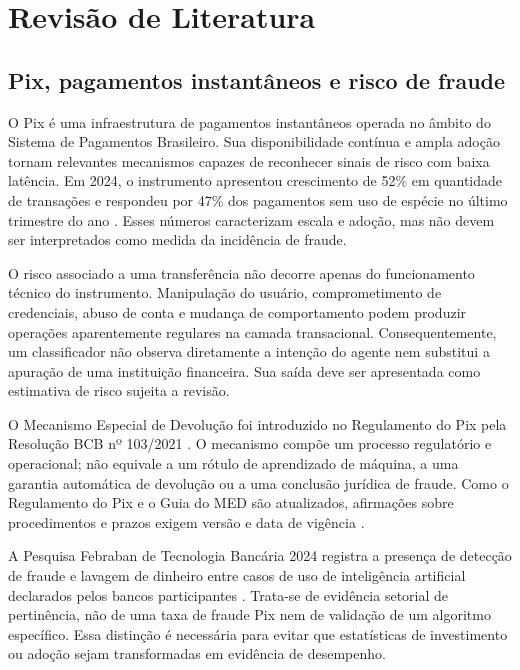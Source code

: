 \chapter{Revisão de Literatura}

\section{Pix, pagamentos instantâneos e risco de fraude}

O Pix é uma infraestrutura de pagamentos instantâneos operada no âmbito do Sistema de Pagamentos Brasileiro. Sua disponibilidade contínua e ampla adoção tornam relevantes mecanismos capazes de reconhecer sinais de risco com baixa latência. Em 2024, o instrumento apresentou crescimento de 52\% em quantidade de transações e respondeu por 47\% dos pagamentos sem uso de espécie no último trimestre do ano \cite{bcb_pagamentos_2024}. Esses números caracterizam escala e adoção, mas não devem ser interpretados como medida da incidência de fraude.

O risco associado a uma transferência não decorre apenas do funcionamento técnico do instrumento. Manipulação do usuário, comprometimento de credenciais, abuso de conta e mudança de comportamento podem produzir operações aparentemente regulares na camada transacional. Consequentemente, um classificador não observa diretamente a intenção do agente nem substitui a apuração de uma instituição financeira. Sua saída deve ser apresentada como estimativa de risco sujeita a revisão.

O Mecanismo Especial de Devolução foi introduzido no Regulamento do Pix pela Resolução BCB nº 103/2021 \cite{bcb_resolucao103_2021}. O mecanismo compõe um processo regulatório e operacional; não equivale a um rótulo de aprendizado de máquina, a uma garantia automática de devolução ou a uma conclusão jurídica de fraude. Como o Regulamento do Pix e o Guia do MED são atualizados, afirmações sobre procedimentos e prazos exigem versão e data de vigência \cite{bcb_resolucao1_2020,bcb_guia_med_v44}.

A Pesquisa Febraban de Tecnologia Bancária 2024 registra a presença de detecção de fraude e lavagem de dinheiro entre casos de uso de inteligência artificial declarados pelos bancos participantes \cite{febraban2024}. Trata-se de evidência setorial de pertinência, não de uma taxa de fraude Pix nem de validação de um algoritmo específico. Essa distinção é necessária para evitar que estatísticas de investimento ou adoção sejam transformadas em evidência de desempenho.

